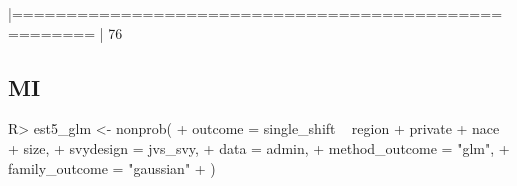\documentclass[
]{jss}
\begin{document}
\begin{CodeChunk}
\begin{CodeOutput}
                   |=====================================================                 |  76%
\end{CodeOutput}
\end{CodeChunk}

\subsection{MI}\label{mi}

\begin{CodeChunk}
\begin{CodeInput}
R> est5_glm <- nonprob(
+   outcome = single_shift ~ region + private + nace + size,
+   svydesign = jvs_svy,
+   data = admin,
+   method_outcome = "glm",
+   family_outcome = "gaussian"
+ )
\end{CodeInput}
\end{CodeChunk}
\end{document}
